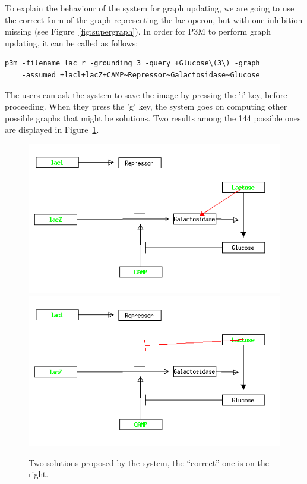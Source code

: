 \documentclass[a4paper]{article}
\begin{document}
To explain the behaviour of the system for graph updating, we are
going to use the correct form of the graph representing the lac
operon, but with one inhibition missing (see
Figure~\ref{fig:supergraph}). 
In order for P3M to perform graph updating, it can be called as
follows:
\begin{verbatim}
p3m -filename lac_r -grounding 3 -query +Glucose\(3\) -graph 
    -assumed +lacl+lacZ+CAMP~Repressor~Galactosidase~Glucose
\end{verbatim}
The users can ask the system to save the image by pressing the 'i' key,
before proceeding. When they press the 'g' key, the system goes on
computing other possible graphs that might be solutions. 
Two results among the 144 possible ones are displayed in Figure~\ref{fig:supergraph2}.
\begin{figure}[htb]
\begin{center}
  \includegraphics[scale=0.3]{lac_r0004.png}
  \includegraphics[scale=0.3]{lac_r0005.png}
\end{center}
\caption{Two solutions proposed by the system, the ``correct'' one is on the right.}
\label{fig:supergraph2}
\end{figure}
\end{document}
